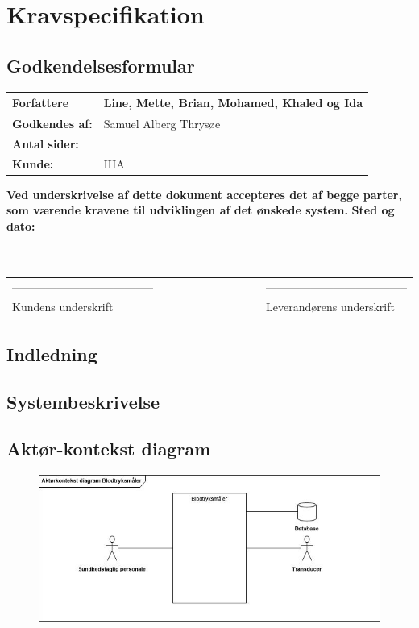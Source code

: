 
\chapter{Kravspecifikation}
\section{Godkendelsesformular}
\begin{table}[h!]
\label{tab:tabel2}
\begin{tabular}{| l | >{\raggedright\arraybackslash}p{12cm} |}
   \hline
   \textbf{Forfattere} & Line, Mette, Brian, Mohamed, Khaled og Ida\\ \hline
   \textbf{Godkendes af:} & Samuel Alberg Thrysøe\\ \hline
   \textbf{Antal sider:} & \\ \hline
   \textbf{Kunde:} & IHA\\ \hline
\end{tabular}
\end{table}
\textbf{Ved underskrivelse af dette dokument accepteres det af begge parter, som værende kravene til udviklingen af det ønskede system.}
\newline
\textbf{Sted og dato:}\\
\\
\\
\begin{table}
[h!]
\begin{tabular}{ l lllllllll l}
--------------------------------------&&&&&&&&&&--------------------------------------\\ 
Kundens underskrift &&&&&&&&&&Leverandørens underskrift\\
\end{tabular}
\end{table}
\section{Indledning}

\section{Systembeskrivelse}

\section{Aktør-kontekst diagram}
\begin{figure}[h!]
\includegraphics[width =1.0\textwidth , right]{billeder/Aktorkontekst.jpg}
\end{figure}
